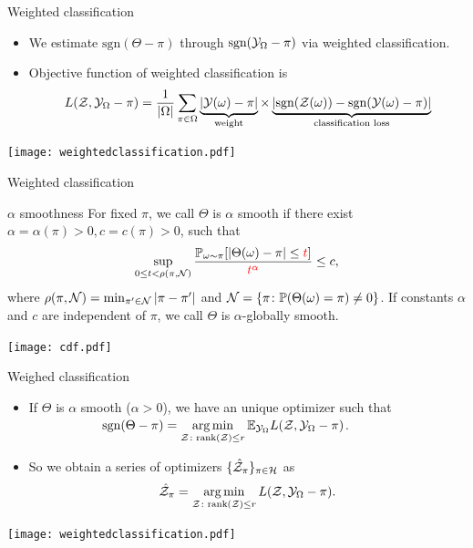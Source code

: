 \documentclass[10pt, mathserif]{beamer} %
\theoremstyle{definition}
\theoremstyle{plain}
\begin{document}
\begin{frame}{Weighted classification}
    \begin{itemize}
    \item We estimate $\text{sgn}(\Theta-\pi)$ through $\text{sgn}(\mathcal{Y}_\Omega-\pi)$ via weighted classification.
    \item Objective function of weighted classification is
    \begin{align}
    L(\mathcal{Z},\mathcal{Y}_\Omega-\pi) = \frac{1}{|\Omega|}\sum_{\pi\in\Omega}\underbrace{|\mathcal{Y}(\omega)-\pi|}_{\text{weight}}\times\underbrace{ |\text{sgn}(\mathcal{Z}(\omega))-\text{sgn}(\mathcal{Y}(\omega)-\pi)|}_{\text{classification loss}}
    \end{align}
    \end{itemize}
       \begin{center}
    \texttt{[image: weightedclassification.pdf]}
    \end{center}
\end{frame}


\begin{frame}{Weighted classification}
\begin{block}{$\alpha$ smoothness}
For fixed $\pi$, we call $\Theta$ is $\alpha$ smooth if there exist $\alpha = \alpha(\pi)>0,c = c(\pi)>0$, such that 
\begin{align}
    \sup_{0\leq t<\rho(\pi,\mathcal{N})}{\mathbb{P}_{\omega\sim\pi}[|\Theta(\omega)-\pi|\leq{ \color{red}t}]\over{\color{red} t^\alpha}}\leq c,
\end{align}
where $\rho(\pi,\mathcal{N}) = \min_{\pi'\in\mathcal{N}}|\pi-\pi'|$ and $\mathcal{N} = \{\pi\colon\mathbb{P}(\Theta(\omega) = \pi)\neq 0\}$.
If constants $\alpha$ and $c$ are independent of $\pi$, we call $\Theta$ is $\alpha$-globally smooth.
\end{block}
 \begin{center}
 \texttt{[image: cdf.pdf]}
 \end{center}
\end{frame}


\begin{frame}{Weighed classification}
   \begin{itemize}
    \item If $\Theta$ is $\alpha$ smooth ($\alpha>0$), we have {\color{red}an unique optimizer}  such that\\[.1cm]
       $\hspace{2cm}\text{sgn}(\Theta-\pi) = \operatorname*{arg\,min}\limits_{\mathcal{Z}\colon \text{rank}(\mathcal{Z})\leq r} \mathbb{E}_{\mathcal{Y}_\Omega}L(\mathcal{Z},\mathcal{Y}_\Omega-\pi)$.\vspace*{.1cm}

    \item So we obtain a series of optimizers $\{\hat {\mathcal{Z}}_\pi\}_{\pi\in\mathcal{H}}$ as
    \begin{align}
        \hat {\mathcal{Z}}_\pi = \operatorname*{arg\,min}_{\mathcal{Z}\colon \text{rank}(\mathcal{Z})\leq r}L(\mathcal{Z},\mathcal{Y}_\Omega-\pi).
    \end{align}
    \end{itemize}
     \begin{center}
 \texttt{[image: weightedclassification.pdf]}
 \end{center}
\end{frame}
\end{document}
